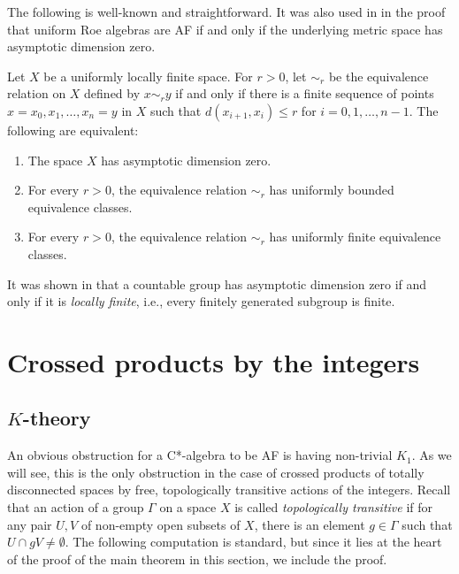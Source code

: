 \documentclass[12pt, a4paper, oneside]{amsart}
\newcommand{\0}{\mathbf{0}}
\newcommand{\1}{\mathbf{1}}
\begin{document}
	The following is well-known and straightforward. It was also used in \cite{li2018low} in the proof that uniform Roe algebras are AF if and only if the underlying metric space has asymptotic dimension zero. 
	\begin{proposition}
		\label{prop_equiv_rel}
		Let \(X\) be a uniformly locally finite space. For \(r > 0\), let \(\sim_r\) be the equivalence relation on \(X\) defined by \(x \sim_r y\) if and only if there is a finite sequence of points \(x = x_0, x_1, \ldots, x_n = y\) in \(X\) such that \(d(x_{i+1}, x_i) \leq r\) for \(i = 0, 1, \ldots, n-1\). The following are equivalent:
		\begin{enumerate}
			\item The space \(X\) has asymptotic dimension zero. 
			\item For every \(r > 0\), the equivalence relation \(\sim_r\) has uniformly bounded equivalence classes. 
			\item For every \(r > 0\), the equivalence relation \(\sim_r\) has uniformly finite equivalence classes. 
		\end{enumerate}
	\end{proposition}
	
	It was shown in \cite[Theorem 2]{smith} that a countable group has asymptotic dimension zero if and only if it is \textit{locally finite}, i.e., every finitely generated subgroup is finite. 
	
	\section{Crossed products by the integers}
	
	\subsection{\(K\)-theory}
	
	An obvious obstruction for a C*-algebra to be AF is having non-trivial \(K_1\). As we will see, this is the only obstruction in the case of crossed products of totally disconnected spaces by free, topologically transitive actions of the integers. Recall that an action of a group \(\Gamma\) on a space \(X\) is called \textit{topologically transitive} if for any pair \(U, V\) of non-empty open subsets of \(X\), there is an element \(g \in \Gamma\) such that \(U \cap gV \neq \emptyset\). The following computation is standard, but since it lies at the heart of the proof of the main theorem in this section, we include the proof. 
	
\end{document}
